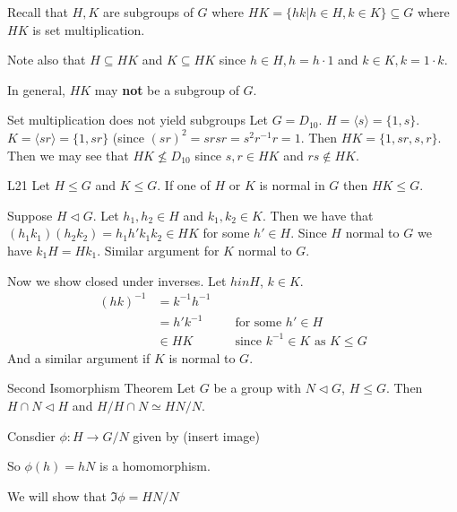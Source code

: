 \documentclass{article}
\begin{document}
Recall that $H, K$ are subgroups of $G$ where $HK = \{ hk | h \in H, k \in K \} \subseteq G$ where $HK$ is set multiplication. 

Note also that $H \subseteq HK$ and $K \subseteq HK$ since $h \in H, h = h\cdot 1$ and $k \in K, k = 1\cdot k$. 

In general, $HK$ may \textbf{not} be a subgroup of $G$. 

\begin{cex}{Set multiplication does not yield subgroups}{}
    Let $G = D_{10}$. $H = \langle s \rangle = \{ 1,s \}$. $K = \langle sr \rangle = \{ 1, sr \}$ (since $(sr)^2 = srsr = s^2r^{-1}r = 1$. Then $HK = \{ 1, sr, s, r \}$. Then we may see that $HK \not\leq D_{10}$ since $s, r \in HK$ and $rs \not\in HK$. 
\end{cex}

\begin{clem}{L21}{}
    Let $H \leq G$ and $K \leq G$. If one of $H$ or $K$ is normal in $G$ then $HK \leq G$. 

    \begin{cpf}
        Suppose $H \triangleleft G$. Let $h_1, h_2 \in H$ and $k_1, k_2 \in K$. Then we have that $ \left( h_1k_1 \right) \left( h_2k_2 \right) = h_1h'k_1k_2 \in HK$ for some $h' \in H$. Since $H$ normal to $G$ we have $k_1H = Hk_1$. Similar argument for $K$ normal to $G$. 

        Now we show closed under inverses. Let $h in H$, $k \in K$. 
        \begin{align*}
            \left( hk \right)^{-1} & = k^{-1}h^{-1}\\
            & = h'k^{-1} && \text{ for some $h' \in H$}\\
            & \in HK && \text{ since $k^{-1} \in K$ as $K \leq G$}
        \end{align*}
        And a similar argument if $K$ is normal to $G$. 
    \end{cpf}
\end{clem}

\begin{cthm}{Second Isomorphism Theorem}{}
    Let $G$ be a group with $N \triangleleft G$, $H \leq G$. Then $H \cap N \triangleleft H$ and $H / H\cap N \simeq HN/N$. 


    \begin{cpf}
        Consdier $\phi: H \to G/N$ given by (insert image)

        So $\phi(h) = hN$ is a homomorphism. 

        We will show that $\Im{\phi} = HN/N$
    \end{cpf}
\end{cthm}
\end{document}

